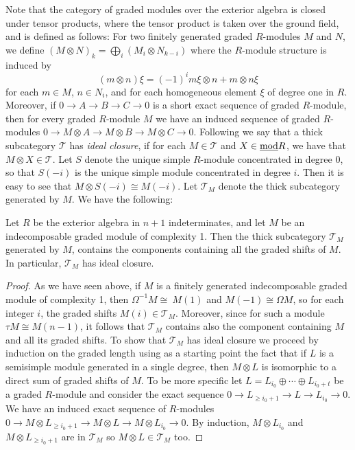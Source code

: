 \documentclass[10pt]{amsart}
\begin{document}
\noindent Note that the category of graded modules over the exterior algebra is closed 
under tensor products, where the tensor product is taken over the ground field, and is defined as follows: 
For two finitely generated graded $R$-modules $M$ and $N$, we define 
$(M\otimes N)_k=\bigoplus_i (M_i\otimes N_{k-i})$ where the $R$-module structure is induced 
by 
$$(m\otimes n)\xi=(-1)^i m\xi \otimes n + m\otimes n\xi $$
 for each $m\in M$, $n\in N_i$, 
and for each homogeneous element $\xi$ of degree one   in $R$. Moreover, if 
$0\rightarrow A\rightarrow B\rightarrow C\rightarrow 0$ is a short exact sequence of graded $R$-module, 
then for every graded $R$-module $M$ we have an induced sequence of graded $R$-modules 
$0\rightarrow M\otimes A\rightarrow M\otimes B\rightarrow M\otimes C\rightarrow 0$. 
Following \cite{BCR} we say that a thick subcategory $\mathcal T$ has {\it ideal closure}, 
if for each $M\in\mathcal T$ and $X\in\underline{\operatorname{mod}} R$, we have that $M\otimes X\in\mathcal T$. 
Let $S$ denote the unique simple $R$-module concentrated in degree $0$, so that 
$S(-i)$ is the unique simple module concentrated in degree $i$. Then it is easy to see 
that $M\otimes S(-i) \cong M(-i)$. Let $\mathcal T_M$ denote the thick subcategory 
generated by $M$. We have the following:

\begin{prop} Let $R$ be the exterior algebra in $n+1$ indeterminates, and let $M$ be an indecomposable 
graded module of complexity 1. Then the thick subcategory $\mathcal T_M$ generated by $M$, 
contains the \AR components containing all the graded shifts of $M$. 
In particular, $\mathcal T_M$ has ideal closure. 
\end{prop}
\begin{proof} As we have seen above, if $M$ is a finitely generated indecomposable
graded module of complexity 1, then $\Omega^{-1}M\cong\ M(1)$ and $M(-1)\cong\Omega M$, 
so for each integer $i$, the graded shifts $M(i)\in\mathcal T_M$. 
Moreover, since for such a module $\tau M\cong M(n-1)$, it follows 
that  $\mathcal T_M$ contains also the \AR component containing $M$ and all its graded shifts. 
To show that $\mathcal T_M$ has ideal closure we proceed by induction on the graded length using
as a starting point the fact that if $L$ is a semisimple module generated in a single degree, 
then $M\otimes L$ is isomorphic to a direct sum of graded shifts of $M$. To be more 
specific let $L=L_{i_0}\oplus\cdots\oplus L_{i_0+t}$ be a graded $R$-module and 
consider the exact sequence $0\rightarrow L_{\ge i_0+1}\rightarrow L\rightarrow L_{ i_0}\rightarrow 0$.
We have an induced exact sequence of $R$-modules 
$0\rightarrow M\otimes L_{\ge i_0+1}\rightarrow M\otimes L\rightarrow M\otimes L_{ i_0}\rightarrow 0$. 
By induction, $M\otimes L_{ i_0}$ and $M\otimes L_{\ge i_0+1}$ are in 
$\mathcal T_M$ so $M\otimes L\in\mathcal T_M$ too.
\end{proof}
\end{document}
